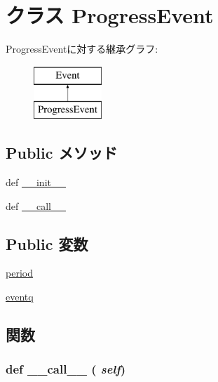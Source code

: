 \hypertarget{classm5_1_1event_1_1ProgressEvent}{
\section{クラス ProgressEvent}
\label{classm5_1_1event_1_1ProgressEvent}
}
ProgressEventに対する継承グラフ:\begin{figure}[H]
\begin{center}
\leavevmode
\includegraphics[height=2cm]{classm5_1_1event_1_1ProgressEvent}
\end{center}
\end{figure}
\subsection*{Public メソッド}
\begin{DoxyCompactItemize}
\item 
def \hyperlink{classm5_1_1event_1_1ProgressEvent_ac775ee34451fdfa742b318538164070e}{\_\-\_\-init\_\-\_\-}
\item 
def \hyperlink{classm5_1_1event_1_1ProgressEvent_ae844e0019d38360a86bac1474132db3c}{\_\-\_\-call\_\-\_\-}
\end{DoxyCompactItemize}
\subsection*{Public 変数}
\begin{DoxyCompactItemize}
\item 
\hyperlink{classm5_1_1event_1_1ProgressEvent_a7bf7bb97f47ddff4363c79517bb55363}{period}
\item 
\hyperlink{classm5_1_1event_1_1ProgressEvent_a36b1251d81fd3992cb823d7438c40f1f}{eventq}
\end{DoxyCompactItemize}


\subsection{関数}
\hypertarget{classm5_1_1event_1_1ProgressEvent_ae844e0019d38360a86bac1474132db3c}{
\subsubsection[{\_\-\_\-call\_\-\_\-}]{\setlength{\rightskip}{0pt plus 5cm}def \_\-\_\-call\_\-\_\- ( {\em self})}}
\label{classm5_1_1event_1_1ProgressEvent_ae844e0019d38360a86bac1474132db3c}



